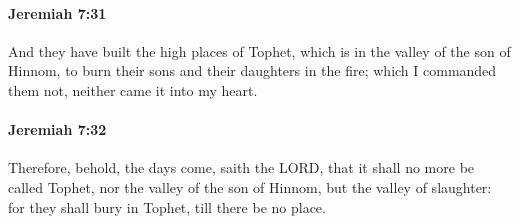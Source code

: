 		\paragraph{Jeremiah 7:31} %
			\label{JEREMIAH-7-31}

			And they have built the high places of Tophet, which is in the valley of the son of Hinnom, to burn their sons and their daughters in the fire; which I commanded them not, neither came it into my heart.


		\paragraph{Jeremiah 7:32} %
			\label{JEREMIAH-7-32}

			Therefore, behold, the days come, saith the LORD, that it shall no more be called Tophet, nor the valley of the son of Hinnom, but the valley of slaughter: for they shall bury in Tophet, till there be no place.

